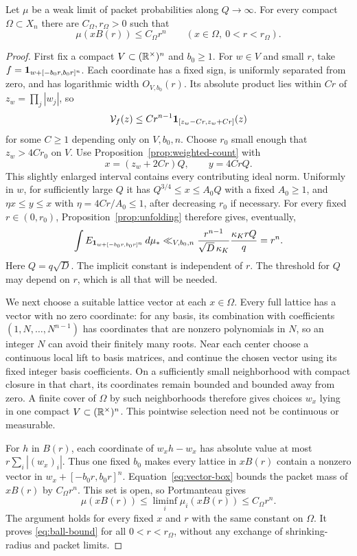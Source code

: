 \begin{proposition}\label{prop:ball-bound}
Let $\mu$ be a weak limit of packet probabilities along
$Q\to\infty$. For every compact $\Omega\subset X_n$ there are
$C_\Omega,r_\Omega>0$ such that
\begin{equation}\label{eq:ball-bound}
 \mu(xB(r))\le C_\Omega r^n
       \qquad(x\in\Omega,\ 0<r<r_\Omega).
\end{equation}
\end{proposition}

\begin{proof}
First fix a compact $V\subset(\mathbb R^\times)^n$ and $b_0\ge1$.
For $w\in V$ and small $r$, take
$f=\mathbf 1_{w+[-b_0r,b_0r]^n}$. Each coordinate has a fixed sign,
is uniformly separated from zero, and has logarithmic width
$O_{V,b_0}(r)$. Its absolute product lies within $Cr$ of
$z_w=\prod_j|w_j|$, so
\[
 \mathcal V_f(z)\le Cr^{n-1}
       \mathbf 1_{[z_w-Cr,z_w+Cr]}(z)
\]
for some $C\ge1$ depending only on $V,b_0,n$.
Choose $r_0$ small enough that $z_w>4Cr_0$ on $V$.
Use Proposition~\ref{prop:weighted-count} with
\[
 x=(z_w+2Cr)Q,\qquad y=4CrQ.
\]
This slightly enlarged interval contains every contributing
ideal norm. Uniformly in $w$, for sufficiently large $Q$ it has
$Q^{3/4}\le x\le A_0Q$ with a fixed $A_0\ge1$, and
$\eta x\le y\le x$ with $\eta=4Cr/A_0\le1$, after decreasing
$r_0$ if necessary. For every fixed $r\in(0,r_0)$,
Proposition~\ref{prop:unfolding} therefore gives, eventually,
\begin{equation}\label{eq:vector-box}
 \int E_{\mathbf 1_{w+[-b_0r,b_0r]^n}}\,d\mu_*
       \ll_{V,b_0,n}
       \frac{r^{n-1}}{\sqrt D\,\kappa_K}
       \frac{\kappa_K rQ}{q}=r^n .
\end{equation}
Here $Q=q\sqrt D$. The implicit constant is independent of $r$. The threshold for $Q$
may depend on $r$, which is all that will be needed.

We next choose a suitable lattice vector at each $x\in\Omega$.
Every full lattice has a vector with no zero coordinate:
for any basis, its combination with coefficients
$(1,N,\ldots,N^{n-1})$ has coordinates that are nonzero
polynomials in $N$, so an integer $N$ can avoid their finitely
many roots. Near each center choose a continuous local lift to basis
matrices, and continue the chosen vector using its fixed integer
basis coefficients. On a sufficiently small neighborhood with compact
closure in that chart, its coordinates remain bounded and bounded away
from zero. A finite cover of $\Omega$ by such neighborhoods therefore
gives choices $w_x$ lying in one compact
$V\subset(\mathbb R^\times)^n$. This pointwise selection need not be
continuous or measurable.

For $h$ in $B(r)$, each coordinate of $w_xh-w_x$ has absolute
value at most $r\sum_i|(w_x)_i|$. Thus one fixed $b_0$ makes
every lattice in $xB(r)$ contain a nonzero vector in
$w_x+[-b_0r,b_0r]^n$. Equation~\eqref{eq:vector-box} bounds
the packet mass of $xB(r)$ by $C_\Omega r^n$.
This set is open, so Portmanteau gives
\[
 \mu(xB(r))\le\liminf_i\mu_i(xB(r))\le C_\Omega r^n.
\]
The argument holds for every fixed $x$ and $r$ with the same
constant on $\Omega$. It proves \eqref{eq:ball-bound} for
all $0<r<r_\Omega$, without any exchange of shrinking-radius
and packet limits.
\end{proof}
